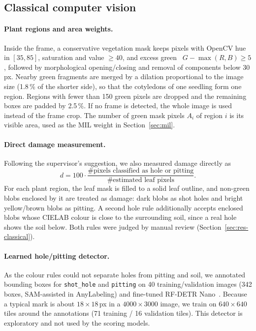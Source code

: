 \subsection{Classical computer vision}
\label{sec:classical}

\paragraph{Plant regions and area weights.} Inside the frame, a conservative vegetation mask keeps
pixels with OpenCV hue in $[35,85]$, saturation and value $\geq 40$, and excess
green~\cite{woebbecke1995color} $G-\max(R,B) \geq 5$, followed by morphological opening/closing and
removal of components below 30\,px. Nearby green fragments are merged by a dilation proportional to
the image size (1.8\,\% of the shorter side), so that the cotyledons of one seedling form one
region. Regions with fewer than 150 green pixels are dropped and the remaining boxes are padded by
2.5\,\%. If no frame is detected, the whole image is used instead of the frame crop. The number of green
mask pixels $A_i$ of region $i$ is its visible area, used as the MIL weight in
Section~\ref{sec:mil}.

\paragraph{Direct damage measurement.} Following the supervisor's suggestion, we also measured
damage directly as
\begin{equation}
  d = 100 \cdot \frac{\#\text{pixels classified as hole or pitting}}{\#\text{estimated leaf pixels}} .
\end{equation}
For each plant region, the leaf mask is filled to a solid leaf outline, and non-green blobs
enclosed by it are treated as damage: dark blobs as shot holes and bright yellow/brown blobs as
pitting. A second hole rule additionally accepts enclosed blobs whose CIELAB colour is close to
the surrounding soil, since a real hole shows the soil below. Both rules
were judged by manual review (Section~\ref{sec:res-classical}).

\paragraph{Learned hole/pitting detector.} As the colour rules could not separate holes from
pitting and soil, we annotated bounding boxes for \texttt{shot\_hole} and \texttt{pitting} on 40
training/validation images (342 boxes, SAM-assisted in AnyLabeling) and fine-tuned RF-DETR
Nano~\cite{rfdetr}. Because a typical mark is about $18\times18$\,px in a $4000\times3000$ image, we
train on $640\times640$ tiles around the annotations (71 training / 16 validation tiles). This
detector is exploratory and not used by the scoring models.


